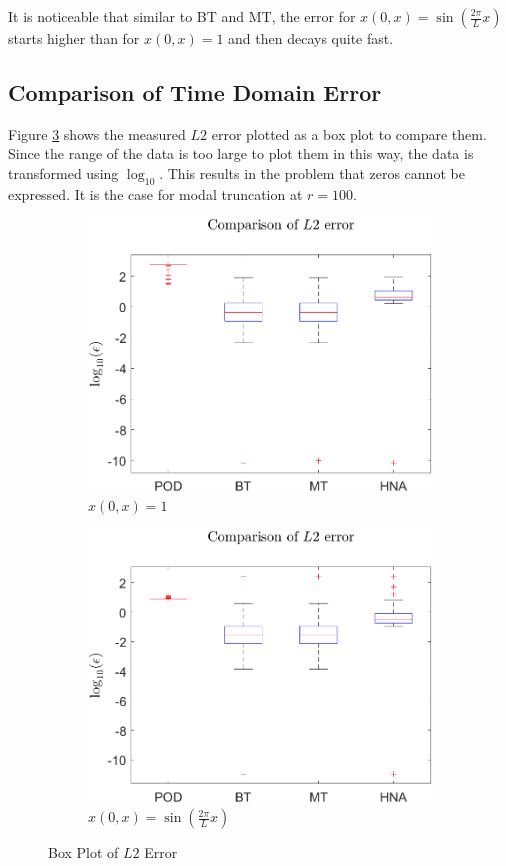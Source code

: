 It is noticeable that similar to BT and MT, the error for \(x(0, x) = \sin(\frac{2\pi}{L}x)\) starts higher than for \(x(0, x) = 1\) and then decays quite fast.

\subsection{Comparison of Time Domain Error}
Figure \ref{FIG-BOX-L2} shows the measured \(L2\) error plotted as a box plot to compare them. 
Since the range of the data is too large to plot them in this way, the data is transformed using \(\log_{10}\).
This results in the problem that zeros cannot be expressed.
It is the case for modal truncation at \(r = 100\).
\begin{figure}[H]
\begin{subfigure}[b]{0.5\textwidth}
\centering
\includegraphics[width=\textwidth]{images/L2_BOX}
\caption{$x(0, x) = 1$}
\label{FIG-BOX}
\end{subfigure}
\begin{subfigure}[b]{0.5\textwidth}
\centering
\includegraphics[width=\textwidth]{images/L2_BOX_SIN}
\caption{$x(0, x) = \sin(\frac{2\pi}{L}x)$}
\label{FIG-BOX-SIN}
\end{subfigure}
\caption{Box Plot of \(L2\) Error}
\label{FIG-BOX-L2}
\end{figure}
